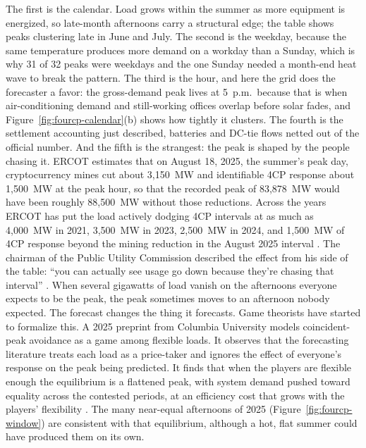 The first is the calendar. Load grows within the summer as more equipment is energized, so late-month afternoons carry a structural edge; the table shows peaks clustering late in June and July. The second is the weekday, because the same temperature produces more demand on a workday than a Sunday, which is why 31 of 32 peaks were weekdays and the one Sunday needed a month-end heat wave to break the pattern. %
The third is the hour, and here the grid does the forecaster a favor: the gross-demand peak lives at 5~p.m.\ because that is when air-conditioning demand and still-working offices overlap before solar fades, and Figure~\ref{fig:fourcp-calendar}(b) shows how tightly it clusters. The fourth is the settlement accounting just described, batteries and DC-tie flows netted out of the official number. And the fifth is the strangest: the peak is shaped by the people chasing it. ERCOT estimates that on August 18, 2025, the summer's peak day, cryptocurrency mines cut about 3,150~MW and identifiable 4CP response about 1,500~MW at the peak hour, so that the recorded peak of 83,878~MW would have been roughly 88,500~MW without those reductions. %
Across the years ERCOT has put the load actively dodging 4CP intervals at as much as 4,000~MW in 2021, 3,500~MW in 2023, 2,500~MW in 2024, and 1,500~MW of 4CP response beyond the mining reduction in the August 2025 interval \autocite{ercotsummer2025review,potomac2021som,potomac2023som,potomac2024som,potomac2026somercot}. %
The chairman of the Public Utility Commission described the effect from his side of the table: ``you can actually see usage go down because they're chasing that interval'' \autocite{tep2026gleeson}. %
When several gigawatts of load vanish on the afternoons everyone expects to be the peak, the peak sometimes moves to an afternoon nobody expected. The forecast changes the thing it forecasts. Game theorists have started to formalize this. A 2025 preprint from Columbia University models coincident-peak avoidance as a game among flexible loads. It observes that the forecasting literature treats each load as a price-taker and ignores the effect of everyone's response on the peak being predicted. It finds that when the players are flexible enough the equilibrium is a flattened peak, with system demand pushed toward equality across the contested periods, at an efficiency cost that grows with the players' flexibility \autocite{chen2025cpgaming}. %
The many near-equal afternoons of 2025 (Figure~\ref{fig:fourcp-window}) are consistent with that equilibrium, although a hot, flat summer could have produced them on its own.

